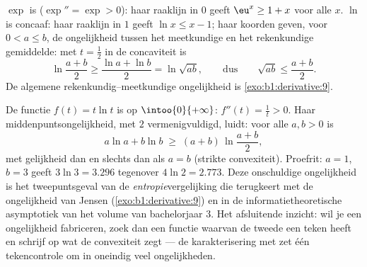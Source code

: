 \begin{example}\label{ex:b1:derivative:convexineq}
$\exp$ is  ($\exp'' = \exp > 0$): haar raaklijn in $0$ geeft
$\eu^x \geq 1 + x$ voor alle $x$. $\ln$ is concaaf: haar raaklijn in
$1$ geeft $\ln x \leq x - 1$; haar koorden geven, voor $0 < a \leq
b$, de ongelijkheid tussen het meetkundige en het rekenkundige
gemiddelde: met $t = \frac12$ in de concaviteit is
\[
\ln\frac{a + b}{2} \geq \frac{\ln a + \ln b}{2} = \ln\sqrt{ab},
\qquad\text{dus}\qquad
\sqrt{ab} \leq \frac{a+b}{2} .
\]
De algemene rekenkundig--meetkundige ongelijkheid is
\cref{exo:b1:derivative:9}.
\end{example}

\begin{example}\label{ex:b1:derivative:xlnx}
De functie $f(t) = t\ln t$ is  op $\intoo{0}{+\infty}$:
$f''(t) = \frac1t > 0$. Haar middenpuntsongelijkheid, met $2$
vermenigvuldigd, luidt: voor alle $a, b > 0$ is
\[
a\ln a + b\ln b \;\geq\; (a + b)\,\ln\frac{a + b}{2} ,
\]
met gelijkheid dan en slechts dan als $a = b$ (strikte
convexiteit). Proefrit: $a = 1$, $b = 3$ geeft $3\ln 3 = 3.296$
tegenover $4\ln 2 = 2.773$. Deze onschuldige ongelijkheid is het
tweepuntsgeval van de \emph{entropie}vergelijking die terugkeert
met de ongelijkheid van Jensen (\cref{exo:b1:derivative:9}) en in
de informatietheoretische asymptotiek van het volume van
bachelorjaar 3. Het afsluitende inzicht: wil je een ongelijkheid
fabriceren, zoek dan een functie waarvan de tweede  een
teken heeft en schrijf op wat de convexiteit zegt --- de
karakterisering met  zet één tekencontrole om in
oneindig veel ongelijkheden.
\end{example}

